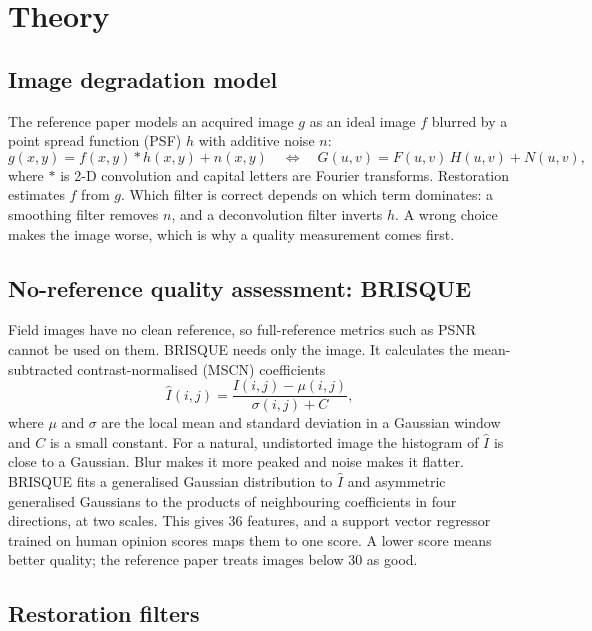 \section{Theory}
\label{sec:theory}

\subsection{Image degradation model}
The reference paper \cite{jia2025} models an acquired image $g$ as an ideal image $f$ blurred by a point spread function (PSF) $h$ with additive noise $n$:
\begin{equation}
g(x,y) = f(x,y) * h(x,y) + n(x,y)
\quad\Longleftrightarrow\quad
G(u,v) = F(u,v)\,H(u,v) + N(u,v),
\label{eq:degradation}
\end{equation}
where $*$ is 2-D convolution and capital letters are Fourier transforms. Restoration estimates $f$ from $g$. Which filter is correct depends on which term dominates: a smoothing filter removes $n$, and a deconvolution filter inverts $h$. A wrong choice makes the image worse, which is why a quality measurement comes first.

\subsection{No-reference quality assessment: BRISQUE}
Field images have no clean reference, so full-reference metrics such as PSNR cannot be used on them. BRISQUE \cite{mittal2012} needs only the image. It calculates the mean-subtracted contrast-normalised (MSCN) coefficients
\begin{equation}
\hat{I}(i,j) = \frac{I(i,j) - \mu(i,j)}{\sigma(i,j) + C},
\end{equation}
where $\mu$ and $\sigma$ are the local mean and standard deviation in a Gaussian window and $C$ is a small constant. For a natural, undistorted image the histogram of $\hat{I}$ is close to a Gaussian. Blur makes it more peaked and noise makes it flatter. BRISQUE fits a generalised Gaussian distribution to $\hat{I}$ and asymmetric generalised Gaussians to the products of neighbouring coefficients in four directions, at two scales. This gives 36 features, and a support vector regressor trained on human opinion scores maps them to one score. A lower score means better quality; the reference paper treats images below 30 as good.

\subsection{Restoration filters}
\label{sec:filters}
